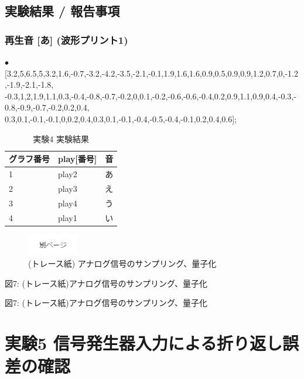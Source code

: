\documentclass[10pt]{article}
\begin{document}
\subsection{実験結果 / 報告事項}
\subsubsection{再生音 [あ] (波形プリント1)}
$\bullet$ [3.2,5,6.5,5,3.2,1.6,-0.7,-3.2,-4.2,-3.5,-2.1,-0.1,1.9,1.6,1.6,0.9,0.5,0.9,0.9,1.2,0.7,0,-1.2,-1.9,-2.1,-1.8,\\ -0.3,1,2,1.9,1.1,0.3,-0.4,-0.8,-0.7,-0.2,0,0.1,-0.2,-0.6,-0.6,-0.4,0.2,0.9,1.1,0.9,0.4,-0.3,-0.8,-0.9,-0.7,-0.2,0.2,0.4,\\
0.3,0.1,-0.1,-0.1,0,0.2,0.4,0.3,0.1,-0.1,-0.4,-0.5,-0.4,-0.1,0.2,0.4,0.6];

\begingroup
\setlength{\tabcolsep}{5pt} %
\renewcommand{\arraystretch}{1.5} %
\begin{table}[H]
    \centering
	\caption{実験4 実験結果}
	\begin{tabular}{|l|l|l|}
	    \hline
	      グラフ番号 & play[番号] & 音 \\[0.5ex]
		\hline\hline
		 1 & play2 & あ  \\ \hline
		 2 & play3 & え  \\ \hline
		 3 & play4 & う  \\ \hline
		 4 & play1 & い  \\ \hline
    \end{tabular}
\end{table} 
\endgroup

\begin{figure}[H]
		\centering
		\includegraphics[width=0.2\textwidth]{page.png}
		\caption{(トレース紙) アナログ信号のサンプリング、量子化}
\end{figure}
\pagebreak

図7: (トレース紙)アナログ信号のサンプリング、量子化
\pagebreak

図7: (トレース紙)アナログ信号のサンプリング、量子化
\pagebreak

\section{実験5  信号発生器入力による折り返し誤差の確認 }
\end{document}
